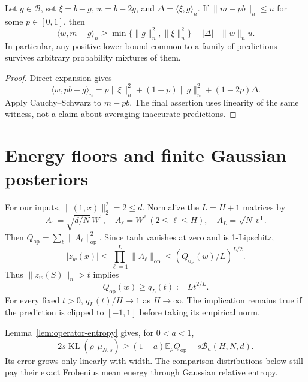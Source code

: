 \begin{lemma}
\label{lem:witness}
Let $g\in\mathcal B$, set $\xi=b-g$, $w=b-2g$, and $\Delta=\langle\xi,g\rangle_n$.
If $\|m-pb\|_n\le u$ for some $p\in[0,1]$, then
\begin{equation}
 \langle w,m-g\rangle_n
 \ge\min\{\|g\|_n^2,\|\xi\|_n^2\}-|\Delta|-\|w\|_n u.
 \label{eq:witness}
\end{equation}
In particular, any positive lower bound common to a family of predictions survives arbitrary probability mixtures of them.
\end{lemma}
\begin{proof}
Direct expansion gives
\[
 \langle w,pb-g\rangle_n
 =p\|\xi\|_n^2+(1-p)\|g\|_n^2+(1-2p)\Delta.
\]
Apply Cauchy--Schwarz to $m-pb$. The final assertion uses linearity of the same witness, not a claim about averaging inaccurate predictions.
\end{proof}

\section{Energy floors and finite Gaussian posteriors}
\label{sec:finite-posterior}
For our inputs, $\|(1,x)\|_2^2=2\le d$. Normalize the $L=H+1$ matrices by
\[
 A_1=\sqrt{d/N}\,W^1,\quad A_\ell=W^\ell\ (2\le\ell\le H),
 \quad A_L=\sqrt N\,v^{\mathsf T}.
\]
Then $Q_{\mathrm{op}}=\sum_\ell\|A_\ell\|_{\mathrm{op}}^2$. Since tanh vanishes at zero and is 1-Lipschitz,
\begin{equation}
 |z_w(x)|\le\prod_{\ell=1}^L\|A_\ell\|_{\mathrm{op}}
            \le(Q_{\mathrm{op}}(w)/L)^{L/2}.
 \label{eq:amgm-floor}
\end{equation}
Thus $\|z_w(S)\|_n>t$ implies
\begin{equation}
 Q_{\mathrm{op}}(w)\ge q_L(t):=L t^{2/L}.
 \label{eq:floor}
\end{equation}
For every fixed $t>0$, $q_L(t)/H\to1$ as $H\to\infty$.
The implication remains true if the prediction is clipped to $[-1,1]$ before taking its empirical norm.

Lemma~\ref{lem:operator-entropy} gives, for $0<a<1$,
\begin{equation}
 2s\operatorname{KL}(\rho\Vert\mu_{N,s})
 \ge(1-a)\mathbb E_\rho Q_{\mathrm{op}}-s\mathcal B_a(H,N,d).
 \label{eq:entropy-floor}
\end{equation}
Its error grows only linearly with width. The comparison distributions below still pay their exact Frobenius mean energy through Gaussian relative entropy.

